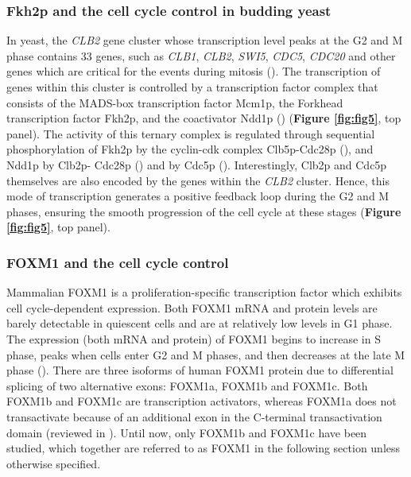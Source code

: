 \subsubsection{Fkh2p and the cell cycle control in budding yeast}

In yeast, the \textit{CLB2} gene cluster whose transcription level peaks at the G2 and M phase contains 33 genes, such as \textit{CLB1}, \textit{CLB2}, \textit{SWI5}, \textit{CDC5}, \textit{CDC20} and other genes which are critical for the events during mitosis (\cite{spellman1998comprehensive}). The transcription of genes within this cluster is controlled by a transcription factor complex that consists of the MADS-box transcription factor Mcm1p, the Forkhead transcription factor Fkh2p, and the coactivator Ndd1p (\cite{koranda2000forkhead-like,darieva2006polo}) (\textbf{Figure \ref{fig:fig5}}, top panel). The activity of this ternary complex is regulated through sequential phosphorylation of Fkh2p by the cyclin-cdk complex Clb5p-Cdc28p (\cite{pic-taylor2004regulation}), and Ndd1p by Clb2p- Cdc28p (\cite{darieva2003cell,reynolds2003recruitment}) and by Cdc5p (\cite{darieva2006polo}). Interestingly, Clb2p and Cdc5p themselves are also encoded by the genes within the \textit{CLB2}  cluster. Hence, this mode of transcription generates a positive feedback loop during the G2 and M phases, ensuring the smooth progression of the cell cycle at these stages (\textbf{Figure \ref{fig:fig5}}, top panel).

\subsubsection{FOXM1 and the cell cycle control}

Mammalian FOXM1 is a proliferation-specific transcription factor which exhibits cell cycle-dependent expression. Both FOXM1 mRNA and protein levels are barely detectable in quiescent cells and are at relatively low levels in G1 phase. The expression (both mRNA and protein) of FOXM1 begins to increase in S phase, peaks when cells enter G2 and M phases, and then decreases at the late M phase (\cite{ye1997hepatocyte,korver1998uncoupling,park2008anaphase-promoting}). There are three isoforms of human FOXM1 protein due to differential splicing of two alternative exons: FOXM1a, FOXM1b and FOXM1c. Both FOXM1b and FOXM1c are transcription activators, whereas FOXM1a does not transactivate because of an additional exon in the C-terminal transactivation domain (reviewed in \cite{laoukili2007foxm1:}). Until now, only FOXM1b and FOXM1c have been studied, which together are referred to as FOXM1 in the following section unless otherwise specified.

